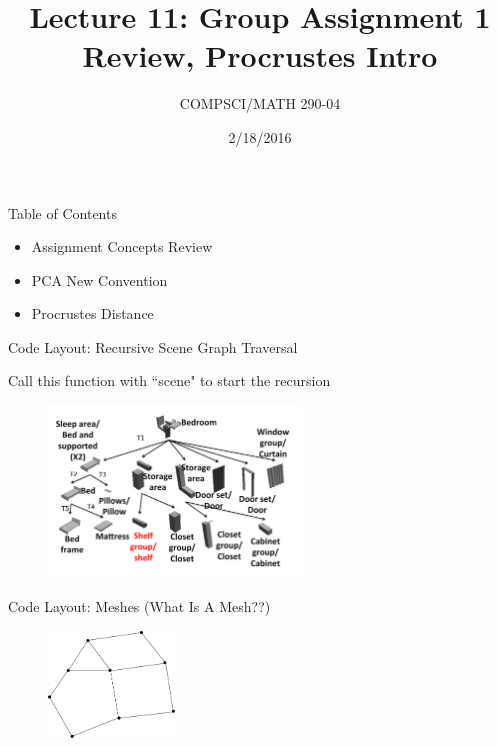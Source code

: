 \documentclass{beamer}
\title{Lecture 11: Group Assignment 1 Review, Procrustes Intro}
\date{2/18/2016}
\institute{Chris Tralie, Duke University}
\author{COMPSCI/MATH 290-04}
\begin{document}
\frame{\titlepage}

\begin{frame}{Table of Contents}
\begin{itemize}[label=$\blacktriangleright$]
	\item Assignment Concepts Review
\end{itemize}
\begin{itemize}[label=$\vartriangleright$]
	\item PCA New Convention
\end{itemize}
\begin{itemize}[label=$\vartriangleright$]
	\item Procrustes Distance
\end{itemize}

\end{frame}



\begin{frame}{Code Layout: Recursive Scene Graph Traversal}



Call this function with ``scene" to start the recursion

\begin{figure}[t]
\centering
\includegraphics[width=0.6\textwidth]{SceneGraphBedroomLabeled.png}
\end{figure}

\end{frame}


\begin{frame}{Code Layout: Meshes (What Is A Mesh??)}

\begin{figure}[t]
\centering
\includegraphics[width=0.3\textwidth]{MeshExample.pdf}
\end{figure}




\end{frame}
\end{document}

